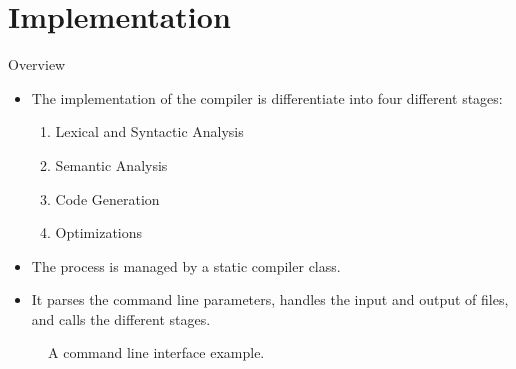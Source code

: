 \section{Implementation}
\begin{frame}{Overview}
    \begin{itemize}
        \item The implementation of the compiler is differentiate into four different stages:
        \begin{enumerate}
            \item Lexical and Syntactic Analysis
            \item Semantic Analysis
            \item Code Generation
            \item Optimizations
        \end{enumerate}
        \item The process is managed by a static compiler class.
        \item It parses the command line parameters, handles the input and output of files, and calls the different stages.
    \end{itemize}    
    \begin{figure}[htp]
        \centering     
        
        \caption{A command line interface example.}
    \end{figure}
\end{frame}

